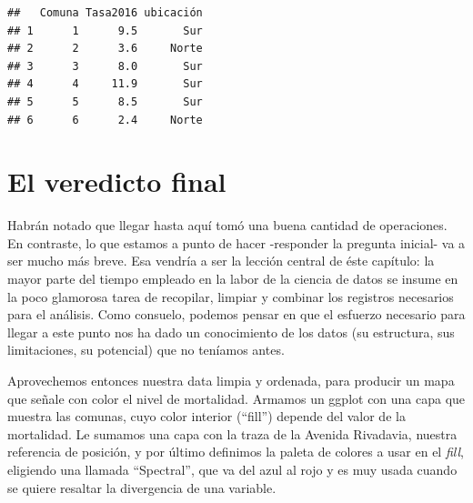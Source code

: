 \documentclass[]{book}
\newenvironment{Shaded}{\begin{snugshade}}{\end{snugshade}}
\newcommand{\KeywordTok}[1]{\textcolor[rgb]{0.13,0.29,0.53}{\textbf{#1}}}
\newcommand{\DataTypeTok}[1]{\textcolor[rgb]{0.13,0.29,0.53}{#1}}
\newcommand{\StringTok}[1]{\textcolor[rgb]{0.31,0.60,0.02}{#1}}
\newcommand{\OperatorTok}[1]{\textcolor[rgb]{0.81,0.36,0.00}{\textbf{#1}}}
\newcommand{\NormalTok}[1]{#1}
\begin{document}
\begin{verbatim}
##   Comuna Tasa2016 ubicación
## 1      1      9.5       Sur
## 2      2      3.6     Norte
## 3      3      8.0       Sur
## 4      4     11.9       Sur
## 5      5      8.5       Sur
## 6      6      2.4     Norte
\end{verbatim}

\section{El veredicto final}\label{el-veredicto-final}

Habrán notado que llegar hasta aquí tomó una buena cantidad de
operaciones. En contraste, lo que estamos a punto de hacer -responder la
pregunta inicial- va a ser mucho más breve. Esa vendría a ser la lección
central de éste capítulo: la mayor parte del tiempo empleado en la labor
de la ciencia de datos se insume en la poco glamorosa tarea de
recopilar, limpiar y combinar los registros necesarios para el análisis.
Como consuelo, podemos pensar en que el esfuerzo necesario para llegar a
este punto nos ha dado un conocimiento de los datos (su estructura, sus
limitaciones, su potencial) que no teníamos antes.

Aprovechemos entonces nuestra data limpia y ordenada, para producir un
mapa que señale con color el nivel de mortalidad. Armamos un ggplot con
una capa que muestra las comunas, cuyo color interior (``fill'') depende
del valor de la mortalidad. Le sumamos una capa con la traza de la
Avenida Rivadavia, nuestra referencia de posición, y por último
definimos la paleta de colores a usar en el \emph{fill}, eligiendo una
llamada ``Spectral'', que va del azul al rojo y es muy usada cuando se
quiere resaltar la divergencia de una variable.

\begin{Shaded}
\end{Shaded}
\end{document}
